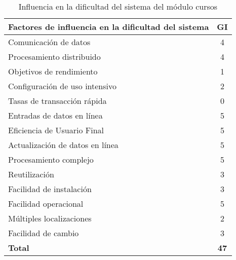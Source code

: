 \documentclass[11pt,a4paper,spanish,twoside]{book}
\begin{document}
\begin{table}[!ht]
  \centering
  \begin{tabular}{|l|c|}
    \hline
    \textbf{Factores de influencia en la dificultad del sistema} & 
    \textbf{GI} \\
    \hline \hline
    Comunicación de datos           & 4 \\ \hline
    Procesamiento distribuido       & 4 \\ \hline
    Objetivos de rendimiento        & 1 \\ \hline
    Configuración de uso intensivo  & 2 \\ \hline
    Tasas de transacción rápida     & 0 \\ \hline
    Entradas de datos en línea      & 5 \\ \hline
    Eficiencia de Usuario Final     & 5 \\ \hline
    Actualización de datos en línea & 5 \\ \hline
    Procesamiento complejo          & 5 \\ \hline
    Reutilización                   & 3 \\ \hline
    Facilidad de instalación        & 3 \\ \hline
    Facilidad operacional           & 5 \\ \hline
    Múltiples localizaciones        & 2 \\ \hline
    Facilidad de cambio             & 3 \\ \hline \hline
    \textbf{Total}                  & \textbf{47} \\ \hline
  \end{tabular}
  \label{tab:infCU}
  \caption{Influencia en la dificultad del sistema del módulo cursos}
\end{table}
\end{document}
